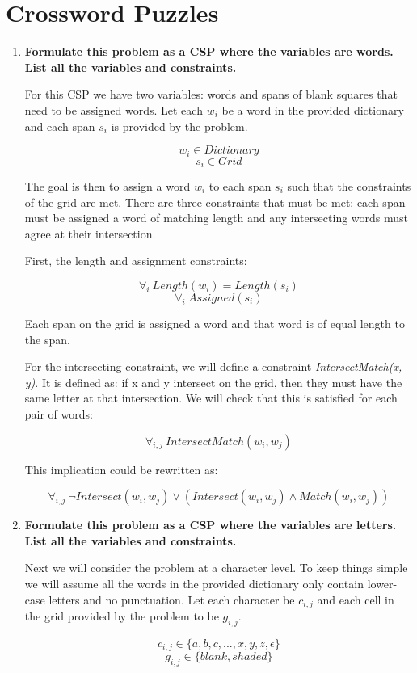 \documentclass[11pt, letterpaper]{hw}
\begin{document}
\section{Crossword Puzzles}
\begin{enumerate}
\item \textbf{Formulate this problem as a CSP where the variables are words. List all the variables and constraints.}

For this CSP we have two variables: words and spans of blank squares that need to be assigned words. Let each $w_i$ be a word in the provided dictionary and each span $s_i$ is provided by the problem.

$$w_i \in Dictionary$$
$$s_i \in Grid$$

The goal is then to assign a word $w_i$ to each span $s_i$ such that the constraints of the grid are met. There are three constraints that must be met: each span must be assigned a word of matching length and any intersecting words must agree at their intersection.

First, the length and assignment constraints:

$$\forall_{i} \ Length(w_i) = Length(s_i)$$
$$\forall_{i} \ Assigned(s_i)$$

Each span on the grid is assigned a word and that word is of equal length to the span.

For the intersecting constraint, we will define a constraint \textit{IntersectMatch(x, y)}. It is defined as: if x and y intersect on the grid, then they must have the same letter at that intersection. We will check that this is satisfied for each pair of words:

$$\forall_{i, j} \ IntersectMatch(w_i, w_j)$$

This implication could be rewritten as:

$$\forall_{i, j} \ \neg Intersect(w_i, w_j) \lor (Intersect(w_i, w_j) \land Match(w_i, w_j))$$

\item \textbf{Formulate this problem as a CSP where the variables are letters. List all the variables and constraints.}

Next we will consider the problem at a character level. To keep things simple we will assume all the words in the provided dictionary only contain lower-case letters and no punctuation. Let each character be $c_{i, j}$ and each cell in the grid provided by the problem to be $g_{i, j}$.

$$c_{i,j} \in \{a, b, c, ... , x, y, z, \epsilon \}$$
$$g_{i,j} \in \{blank, shaded\}$$


\end{enumerate}
\end{document}
